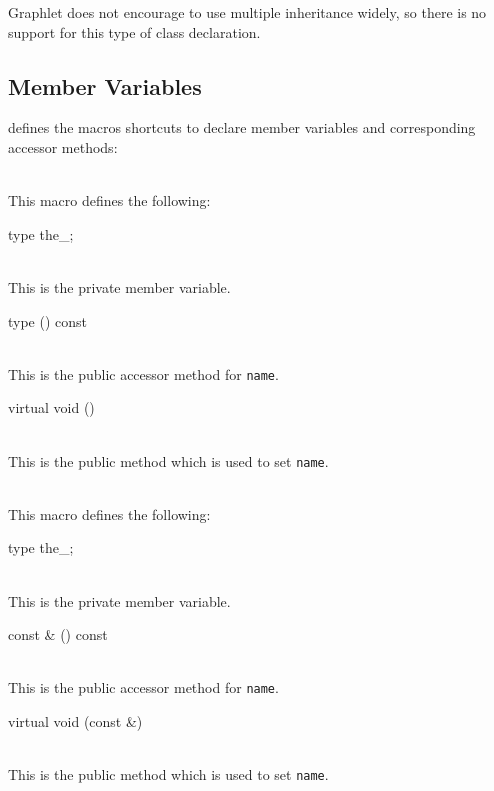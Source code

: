 \documentclass[twoside,fleqn]{report}
\begin{document}
\begin{notes}
  \item Graphlet does not encourage to use multiple inheritance
  widely, so there is no support for this type of class
  declaration.
\end{notes}

%
%

\subsection{Member Variables}
\label{s:MemberVariables}

\Graphlet{} defines the macros  shortcuts to declare 
member variables and corresponding accessor methods:
  
\begin{Cdefinition}

  \item[\GT{VARIABLE (\Param{type}, \Param{name})}] \strut\\
  This macro defines the following:
  
  \begin{ttdescription}
    \item[type the\_\Param{name};] \strut\\
    This is the private member variable.
    
    \item[type \Param{name}() const] \strut\\
    This is the public accessor method for \texttt{name}.

    \item[virtual void \Param{name} (\Param{type})] \strut\\
    This is the public method which is used to set \texttt{name}.
  \end{ttdescription}
  
  \item[\GT{COMPLEX\_VARIABLE (\Param{type}, \Param{name})}] \strut\\
  This macro defines the following:
  
  \begin{ttdescription}
    \item[type the\_\Param{name};] \strut\\
    This is the private member variable.
    
    \item[const \Param{type}\& \Param{name}() const] \strut\\
    This is the public accessor method for \texttt{name}.

    \item[virtual void \Param{name} (const \Param{type}\&)] \strut\\
    This is the public method which is used to set \texttt{name}.
  \end{ttdescription}
  
\end{Cdefinition}
\end{document}
